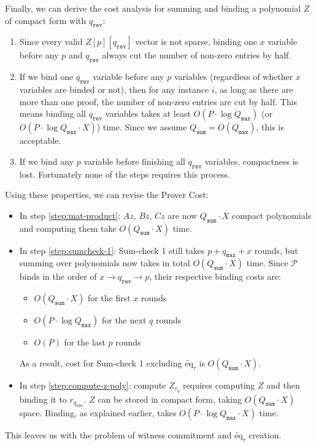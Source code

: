 \documentclass{article}
\newcommand{\Qsum}{Q_{\mathtt{sum}}}
\newcommand{\Qmax}{Q_{\mathtt{max}}}
\newcommand{\qmax}{q_{\mathtt{max}}}
\newcommand{\qrev}{q_{\mathtt{rev}}}
\renewcommand{\P}{\mathcal{P}}
\newcommand{\eq}{\widetilde{\mbox{eq}}}
\begin{document}
Finally, we can derive the cost analysis for summing and binding a polynomial $Z$ of compact form with $\qrev$:
\begin{enumerate}
    \item Since every valid $Z[p][\qrev]$ vector is not sparse, binding one $x$ variable before any $p$ and $\qrev$ always cut the number of non-zero entries by half.
    \item If we bind one $\qrev$ variable before any $p$ variables (regardless of whether $x$ variables are binded or not), then for any instance $i$, as long as there are more than one proof, the number of non-zero entries are cut by half. This means binding all $\qrev$ variables takes at least $O(P \cdot \log \Qmax)$ (or $O(P \cdot \log \Qmax\cdot X)$) time. Since we assume $\Qsum = O(\Qmax)$, this is acceptable.
    \item If we bind any $p$ variable before finishing all $\qrev$ variables, compactness is lost. Fortunately none of the steps requires this process.
\end{enumerate}
Using these properties, we can revise the Prover Cost:
\begin{itemize}
    \item In step \ref{step:mat-product}: $Az$, $Bz$, $Cz$ are now $\Qsum \cdot X$ compact polynomials and computing them take $O(\Qsum \cdot X)$ time.
    \item In step \ref{step:sumcheck-1}: Sum-check 1 still takes $p + \qmax + x$ rounds, but summing over polynomials now takes in total $O(\Qsum \cdot X)$ time. Since $\P$ binds in the order of $x \to \qrev \to p$, their respective binding costs are:
    \begin{itemize}
        \item $O(\Qsum \cdot X)$ for the first $x$ rounds
        \item $O(P \cdot \log \Qmax)$ for the next $q$ rounds
        \item $O(P)$ for the last $p$ rounds
    \end{itemize}
    As a result, cost for Sum-check 1 excluding $\eq_\tau$ is $O(\Qsum \cdot X)$.
    \item In step \ref{step:compute-z-poly}: compute $Z_{r_q}$ requires computing $Z$ and then binding it to $r_{\qrev}$. $Z$ can be stored in compact form, taking $O(\Qsum \cdot X)$ space. Binding, as explained earlier, takes $O(P \cdot \log \Qmax\cdot X)$ time.
\end{itemize}
This leaves us with the problem of witness commitment and $\eq_\tau$ creation.
\end{document}
